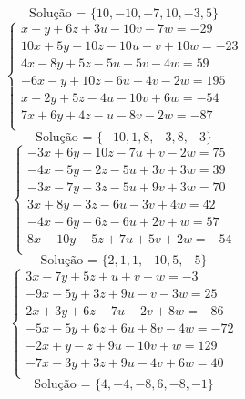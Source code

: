 \documentclass[12pt,oneside,a4paper]{article}
\begin{document}
\begin{equation*}
\text{Solução = }\{10,-10,-7,10,-3,5\}
\end{equation*}
\vspace{\baselineskip}
\begin{equation*}
\begin{cases}
x+y+6z+3u-10v-7w=-29 \\
10x+5y+10z-10u-v+10w=-23 \\
4x-8y+5z-5u+5v-4w=59 \\
-6x-y+10z-6u+4v-2w=195 \\
x+2y+5z-4u-10v+6w=-54 \\
7x+6y+4z-u-8v-2w=-87 \\
\end{cases}
\end{equation*}
\begin{equation*}
\text{Solução = }\{-10,1,8,-3,8,-3\}
\end{equation*}
\vspace{\baselineskip}
\begin{equation*}
\begin{cases}
-3x+6y-10z-7u+v-2w=75 \\
-4x-5y+2z-5u+3v+3w=39 \\
-3x-7y+3z-5u+9v+3w=70 \\
3x+8y+3z-6u-3v+4w=42 \\
-4x-6y+6z-6u+2v+w=57 \\
8x-10y-5z+7u+5v+2w=-54 \\
\end{cases}
\end{equation*}
\begin{equation*}
\text{Solução = }\{2,1,1,-10,5,-5\}
\end{equation*}
\vspace{\baselineskip}
\begin{equation*}
\begin{cases}
3x-7y+5z+u+v+w=-3 \\
-9x-5y+3z+9u-v-3w=25 \\
2x+3y+6z-7u-2v+8w=-86 \\
-5x-5y+6z+6u+8v-4w=-72 \\
-2x+y-z+9u-10v+w=129 \\
-7x-3y+3z+9u-4v+6w=40 \\
\end{cases}
\end{equation*}
\begin{equation*}
\text{Solução = }\{4,-4,-8,6,-8,-1\}
\end{equation*}
\end{document}
